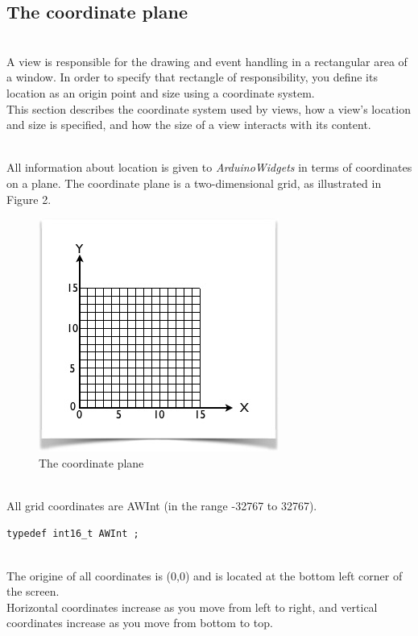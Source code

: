 \documentclass[a4paper,11pt]{extarticle}
\begin{document}
\newpage
\subsection{The coordinate plane}

~\\ A view is responsible for the drawing and event handling in a rectangular area of a window. In order to specify that rectangle of responsibility, you define its location as an origin point and size using a coordinate system.
~\\This section describes the coordinate system used by views, how a view's location and size is specified, and how the size of a view interacts with its content.

~\\ All information about location is given to \emph{ArduinoWidgets} in terms of coordinates on a plane. The coordinate plane is a two-dimensional grid, as illustrated in Figure 2.

\begin{figure}[htbp]
   \centering
   \includegraphics[scale=1]{AWFig2.png} 
   \caption{The coordinate plane}
   \label{fig:2 }
\end{figure}

~\\All grid coordinates are AWInt (in the range -32767 to 32767).

\begin{lstlisting}[language=Arduinonl]
typedef int16_t AWInt ;
\end{lstlisting}

~\\The origine of all coordinates is (0,0) and is located at the bottom left corner of the screen.
~\\Horizontal coordinates increase as you move from left to right, and vertical coordinates increase as you move from bottom to top. 
\end{document}

